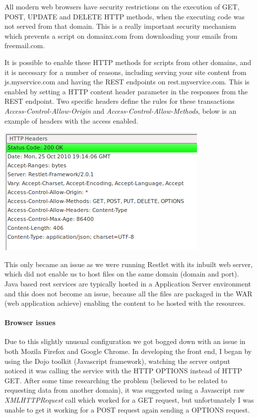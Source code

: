\documentclass[pdftex,11pt,a4paper]{article}
\begin{document}
All modern web browsers have security restrictions on the execution of GET, POST, UPDATE and DELETE HTTP methods, when the executing code was not served from that domain. This is a really important security mechanism which prevents a script on domainx.com from downloading your emails from freemail.com.

It is possible to enable these HTTP methods for scripts from other domains, and it is necessary for a number of reasons, including serving your site content from js.myservice.com and having the REST endpoints on rest.myservice.com. This is enabled by setting a HTTP content header parameter in the responses from the REST endpoint.  Two specific headers define the rules for these transactions \emph{Access-Control-Allow-Origin} and \emph{Access-Control-Allow-Methods}, below is an example of headers with the access enabled.

\begin{center}
	\includegraphics[scale=.7]{images/content_headers.png}
\end{center}

This only became an issue as we were running Restlet with its inbuilt web server, which did not enable us to host files on the same domain (domain and port). Java based rest services are typically hosted in a Application Server environment and this does not become an issue, because all the files are packaged in the WAR (web application achieve) enabling the content to be hosted with the resources.

\paragraph{Browser issues}
Due to this slightly unusual configuration we got bogged down with an issue in both Mozila Firefox and Google Chrome. In developing the front end, I began by using the Dojo toolkit (Javascript framework)\cite{website:dojo}, watching the server output noticed it was calling the service with the HTTP OPTIONS instead of HTTP GET. After some time researching the problem (believed to be related to requesting data from another domain), it was suggested using a Javascript raw \emph{XMLHTTPRequest} call which worked for a GET request, but unfortunately I was unable to get it working for a POST request again sending a OPTIONS request. 
\end{document}

